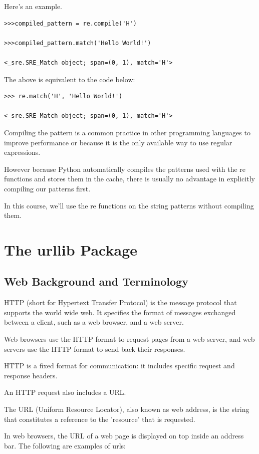 \documentclass{article}
\begin{document}
Here's an example.  

\begin{lstlisting}
>>>compiled_pattern = re.compile('H')

>>>compiled_pattern.match('Hello World!')

<_sre.SRE_Match object; span=(0, 1), match='H'>
\end{lstlisting}

The above is equivalent to the code below:

\begin{lstlisting}
>>> re.match('H', 'Hello World!')

<_sre.SRE_Match object; span=(0, 1), match='H'>
\end{lstlisting}

Compiling the pattern is a common practice in other programming languages to improve performance or because it is the only available way to use regular expressions.

However because Python automatically compiles the patterns used with the re functions and stores them in the cache, there is usually no advantage in explicitly compiling our patterns first.

In this course, we'll use the re functions on the string patterns without compiling them.

\section{The urllib Package}
\subsection{Web Background and Terminology}
HTTP (short for Hypertext Transfer Protocol) is the message protocol that supports the world wide web. It specifies the format of messages exchanged between a client, such as a web browser, and a web server.

Web browsers use the HTTP format to request pages from a web server, and web servers use the HTTP format to send back their responses.

HTTP is a fixed format for communication:  it includes specific request and response headers. 

An HTTP request also includes a URL.

The URL (Uniform Resource Locator), also known as web address, is the string that constitutes a reference to the 'resource' that is requested.

In web browsers, the URL of a web page is displayed on top inside an address bar.  The following are examples of urls:
\end{document}
